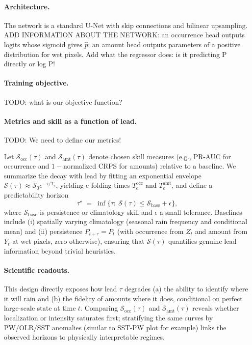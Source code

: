 \documentclass{article}
\begin{document}
\paragraph{Architecture.}
The network is a standard U-Net with skip connections and bilinear upsampling. ADD INFORMATION ABOUT THE NETWORK: an occurrence head outputs logits whose sigmoid gives \(\widehat{p}\); an amount head outputs parameters of a positive distribution for wet pixels. Add what the regressor does: is it predicting P directly or log P!

\paragraph{Training objective.}
TODO: what is our objective function?

\paragraph{Metrics and skill as a function of lead.}
TODO: We need to define our metrics!

Let \(\mathcal{S}_{\text{occ}}(\tau)\) and \(\mathcal{S}_{\text{amt}}(\tau)\) denote chosen skill measures (e.g., PR-AUC for occurrence and \(1-\)normalized CRPS for amounts) relative to a baseline. We summarize the decay with lead by fitting an exponential envelope \( \mathcal{S}(\tau)\approx \mathcal{S}_0 e^{-\tau/T_e}\), yielding e-folding times \(T_e^{\text{occ}}\) and \(T_e^{\text{amt}}\), and define a predictability horizon
\[
\tau^\star \;=\; \inf\{\tau:\ \mathcal{S}(\tau)\le \mathcal{S}_{\text{base}}+\epsilon\},
\]
where \(\mathcal{S}_{\text{base}}\) is persistence or climatology skill and \(\epsilon\) a small tolerance. Baselines include (i) spatially varying climatology (seasonal rain frequency and conditional mean) and (ii) persistence \(P_{t+\tau}=P_t\) (with occurrence from \(Z_t\) and amount from \(Y_t\) at wet pixels, zero otherwise), ensuring that \(\mathcal{S}(\tau)\) quantifies genuine lead information beyond trivial heuristics.

\paragraph{Scientific readouts.}
This design directly exposes how lead \(\tau\) degrades (a) the ability to identify where it will rain and (b) the fidelity of amounts where it does, conditional on perfect large-scale state at time \(t\). Comparing \(\mathcal{S}_{\text{occ}}(\tau)\) and \(\mathcal{S}_{\text{amt}}(\tau)\) reveals whether localization or intensity saturates first; stratifying the same curves by PW/OLR/SST anomalies (similar to SST-PW plot for example) links the observed horizons to physically interpretable regimes.
\end{document}
